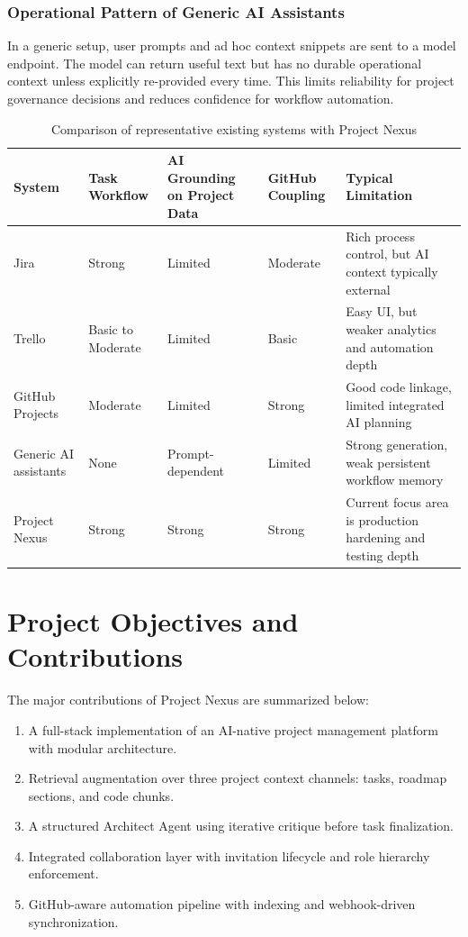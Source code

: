 \documentclass[a4paper, 11pt, oneside]{Dissertation}
\begin{document}
\subsubsection{Operational Pattern of Generic AI Assistants}
In a generic setup, user prompts and ad hoc context snippets are sent to a model endpoint. The model can return useful text but has no durable operational context unless explicitly re-provided every time. This limits reliability for project governance decisions and reduces confidence for workflow automation.

\begin{table}[H]
\centering
\begin{tabular}{|L{2.2cm}|C{1.7cm}|C{1.8cm}|C{1.8cm}|L{2.5cm}|}
\hline
\textbf{System} & \textbf{Task Workflow} & \textbf{AI Grounding on Project Data} & \textbf{GitHub Coupling} & \textbf{Typical Limitation} \\
\hline
Jira & Strong & Limited & Moderate & Rich process control, but AI context typically external \\
\hline
Trello & Basic to Moderate & Limited & Basic & Easy UI, but weaker analytics and automation depth \\
\hline
GitHub Projects & Moderate & Limited & Strong & Good code linkage, limited integrated AI planning \\
\hline
Generic AI assistants & None & Prompt-dependent & Limited & Strong generation, weak persistent workflow memory \\
\hline
Project Nexus & Strong & Strong & Strong & Current focus area is production hardening and testing depth \\
\hline
\end{tabular}
\caption{Comparison of representative existing systems with Project Nexus}
\label{tab:system-comparison}
\end{table}

\section{Project Objectives and Contributions}
The major contributions of Project Nexus are summarized below:

\begin{enumerate}
\item A full-stack implementation of an AI-native project management platform with modular architecture.
\item Retrieval augmentation over three project context channels: tasks, roadmap sections, and code chunks.
\item A structured Architect Agent using iterative critique before task finalization.
\item Integrated collaboration layer with invitation lifecycle and role hierarchy enforcement.
\item GitHub-aware automation pipeline with indexing and webhook-driven synchronization.
\end{enumerate}
\end{document}
